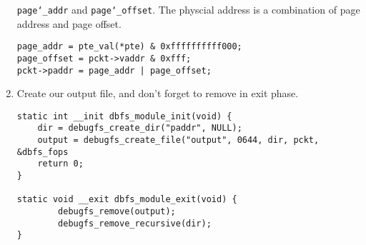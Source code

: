 \begin{enumerate}
\texttt{page\char`_addr} and \texttt{page\char`_offset}.
The physcial address is a combination of page address and page offset.
\begin{lstlisting}
page_addr = pte_val(*pte) & 0xffffffffff000;
page_offset = pckt->vaddr & 0xfff;
pckt->paddr = page_addr | page_offset;
\end{lstlisting}

\item Create our output file, and don't forget to remove in exit phase.
\begin{lstlisting}
static int __init dbfs_module_init(void) {
    dir = debugfs_create_dir("paddr", NULL);
    output = debugfs_create_file("output", 0644, dir, pckt, &dbfs_fops
    return 0;
}

static void __exit dbfs_module_exit(void) {
		debugfs_remove(output);
		debugfs_remove_recursive(dir);
}

\end{lstlisting}


\end{enumerate}
